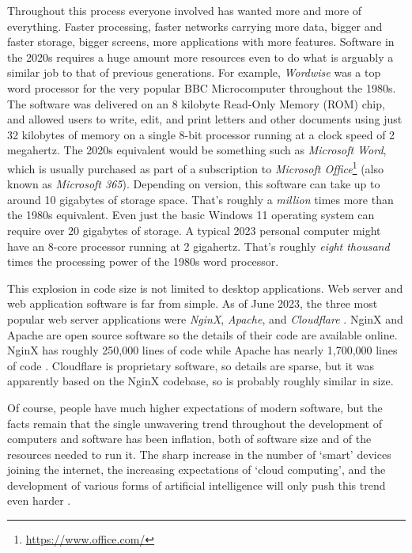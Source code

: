 Throughout this process everyone involved has wanted more and more of everything. Faster processing, faster networks carrying more data, bigger and faster storage, bigger screens, more applications with more features.  Software in the 2020s requires a huge amount more resources even to do what is arguably a similar job to that of previous generations. For example, \emph{Wordwise} \citep{Wordwise2023} was a top word processor for the very popular BBC Microcomputer throughout the 1980s. The software was delivered on an 8 kilobyte Read-Only Memory (ROM) chip, and allowed users to write, edit, and print letters and other documents using just 32 kilobytes of memory on a single 8-bit processor running at a clock speed of 2 megahertz. The 2020s equivalent would be something such as \emph{Microsoft Word}, which is usually purchased as part of a subscription to \emph{Microsoft Office}\footnote{\url{https://www.office.com/}} (also known as \emph{Microsoft 365}). Depending on version, this software can take up to around 10 gigabytes of storage space. That's roughly a \emph{million} times more than the 1980s equivalent. Even just the basic Windows 11 operating system can require over 20 gigabytes of storage. A typical 2023 personal computer might have an 8-core processor running at 2 gigahertz. That's roughly \emph{eight thousand} times the processing power of the 1980s word processor.

This explosion in code size is not limited to desktop applications. Web server and \gls{web application} software is far from simple. As of June 2023, the three most popular web server applications were \emph{NginX}, \emph{Apache}, and \emph{Cloudflare} \citep{Netcraft2023}. NginX and Apache are open source software so the details of their code are available online. NginX has roughly 250,000 lines of code \citep{Openhub2023a} while Apache has nearly 1,700,000 lines of code \citep{Openhub2023}. Cloudflare is proprietary software, so details are sparse, but it was apparently based on the NginX codebase, so is probably roughly similar in size.

Of course, people have much higher expectations of modern software, but the facts remain that the single unwavering trend throughout the development of computers and software has been inflation, both of software size and of the resources needed to run it. The sharp increase in the number of `smart' devices joining the internet, the increasing expectations of `\gls{cloud computing}', and the development of various forms of \gls{artificial intelligence} will only push this trend even harder \citep{Falk2023}.

